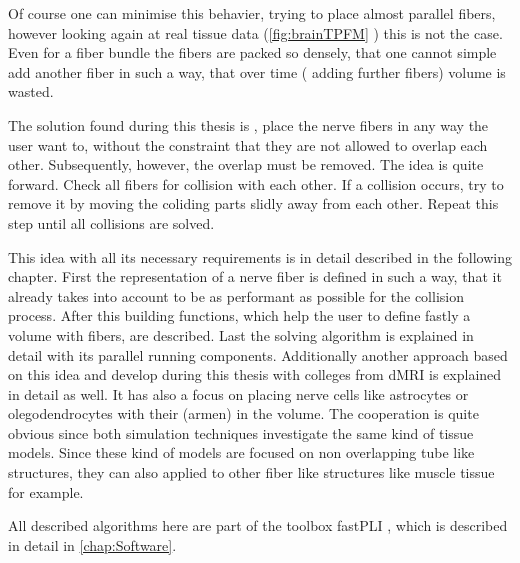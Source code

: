 Of course one can minimise this behavier, \eg{} trying to place almost parallel fibers, however looking again at real tissue data (\cref{fig:brainTPFM} \dummy{}) this is not the case.
Even for a fiber bundle the fibers are packed so densely, that one cannot simple add another fiber in such a way, that over time (\ie{} adding further fibers) volume is wasted.
\par
% 
The solution found during this thesis is , place the nerve fibers in any way the user want to, without the constraint that they are not allowed to overlap each other.
Subsequently, however, the overlap must be removed.
The idea is quite forward.
Check all fibers for collision with each other.
If a collision occurs, try to remove it by moving the coliding parts slidly away from each other.
Repeat this step until all collisions are solved.
\par
% 
This idea \cite{Matuschke2019} with all its necessary requirements is in detail described in the following chapter.
First the representation of a nerve fiber is defined in such a way, that it already takes into account to be as performant as possible for the collision process.
After this building functions, which help the user to define fastly a volume with fibers, are described.
Last the solving algorithm is explained in detail with its parallel running components.
Additionally another approach based on this idea and develop during this thesis with colleges from \ac{dMRI} is explained in detail as well.
It has also a focus on placing nerve cells like astrocytes or olegodendrocytes with their (armen) in the volume.
The cooperation is quite obvious since both simulation techniques investigate the same kind of tissue models.
Since these kind of models are focused on non overlapping tube like structures, they can also applied to other fiber like structures like muscle tissue for example.
\par
% 
All described algorithms here are part of the toolbox \ac{fastPLI} \cite{Matuschke2021}, which is described in detail in \cref{chap:Software}.
% 
% 
% 
% 
